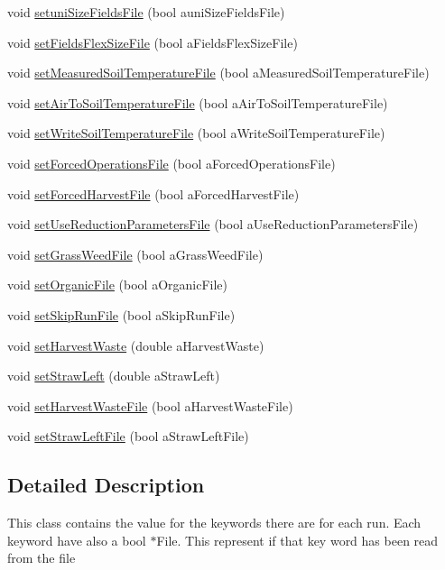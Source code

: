 \begin{DoxyCompactItemize}
void \hyperlink{classsystem_run_data_a611fd18834ca93487fc173cb1053c152}{setuniSizeFieldsFile} (bool auniSizeFieldsFile)
\item 
void \hyperlink{classsystem_run_data_a24d4c1389d1af5f67cf0b9f453833c10}{setFieldsFlexSizeFile} (bool aFieldsFlexSizeFile)
\item 
void \hyperlink{classsystem_run_data_a1fc08424c4b79e344456650391c2a403}{setMeasuredSoilTemperatureFile} (bool aMeasuredSoilTemperatureFile)
\item 
void \hyperlink{classsystem_run_data_a298a875d135aa5013aee7008e1bf38f0}{setAirToSoilTemperatureFile} (bool aAirToSoilTemperatureFile)
\item 
void \hyperlink{classsystem_run_data_afe0fbc78b02eb7f0b3a294ed936ebb43}{setWriteSoilTemperatureFile} (bool aWriteSoilTemperatureFile)
\item 
void \hyperlink{classsystem_run_data_ababaace17d2cf77459e8849e24468c3d}{setForcedOperationsFile} (bool aForcedOperationsFile)
\item 
void \hyperlink{classsystem_run_data_a3b7cd49bc1630a54ae34102205475e9b}{setForcedHarvestFile} (bool aForcedHarvestFile)
\item 
void \hyperlink{classsystem_run_data_a096de4bf355cc68588125aea4a656dbe}{setUseReductionParametersFile} (bool aUseReductionParametersFile)
\item 
void \hyperlink{classsystem_run_data_a7a7e9f015f0cf1576afd76e7d5688fde}{setGrassWeedFile} (bool aGrassWeedFile)
\item 
void \hyperlink{classsystem_run_data_ad777a7105ce6dedf4f775600e29a6775}{setOrganicFile} (bool aOrganicFile)
\item 
void \hyperlink{classsystem_run_data_a72fd012ed04d2e364ea7a9842fe61f34}{setSkipRunFile} (bool aSkipRunFile)
\item 
void \hyperlink{classsystem_run_data_aef021f99f500ebb6bcf630af2c280f68}{setHarvestWaste} (double aHarvestWaste)
\item 
void \hyperlink{classsystem_run_data_aef6a1426f24fa52826e79eb2176cb918}{setStrawLeft} (double aStrawLeft)
\item 
void \hyperlink{classsystem_run_data_aad9a2f50dfcaf2c682ad1e5d9e31d724}{setHarvestWasteFile} (bool aHarvestWasteFile)
\item 
void \hyperlink{classsystem_run_data_ad6e404f37ef840ffa3ce14165ef90590}{setStrawLeftFile} (bool aStrawLeftFile)
\end{DoxyCompactItemize}


\subsection{Detailed Description}
This class contains the value for the keywords there are for each run. Each keyword have also a bool $\ast$File. This represent if that key word has been read from the file 

